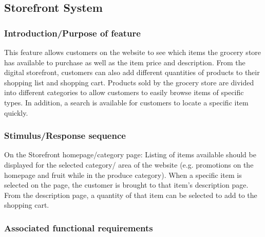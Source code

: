\documentclass{scrreprt}
\theoremstyle{funreq}
\begin{document}
	








	\subsection{Storefront System}
\subsubsection{Introduction/Purpose of feature}
This feature allows customers on the website to see which items the grocery store has available to purchase as well as the item price and description.  From the digital storefront, customers can also add different quantities of products to their shopping list and shopping cart.  Products sold by the grocery store are divided into different categories to allow customers to easily browse items of specific types.  In addition, a search is available for customers to locate a specific item quickly.
\subsubsection{Stimulus/Response sequence}
On the Storefront homepage/category page: Listing of items available should be displayed for the selected category/ area of the website (e.g. promotions on the homepage and fruit while in the produce category).  When a specific item is selected on the page, the customer is brought to that item’s description page.  From the description page, a quantity of that item can be selected to add to the shopping cart.  
\subsubsection{Associated functional requirements}
\end{document}
